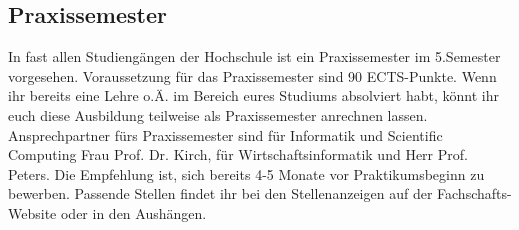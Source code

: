 \subsection{Praxissemester}
In fast allen Studiengängen der Hochschule ist ein Praxissemester im 
5.Semester vorgesehen. Voraussetzung für das Praxissemester sind 
90 ECTS-Punkte. Wenn ihr bereits eine Lehre o.Ä. im Bereich eures 
Studiums absolviert habt, könnt ihr euch diese Ausbildung teilweise als 
Praxissemester anrechnen lassen. Ansprechpartner fürs Praxissemester 
sind für Informatik und Scientific Computing Frau Prof. Dr. Kirch, für 
Wirtschaftsinformatik und Herr Prof. Peters.\doublebreak
Die Empfehlung ist, sich bereits 4-5 Monate vor Praktikumsbeginn zu 
bewerben. Passende Stellen findet ihr bei den Stellenanzeigen auf der 
Fachschafts-Website oder in den Aushängen.